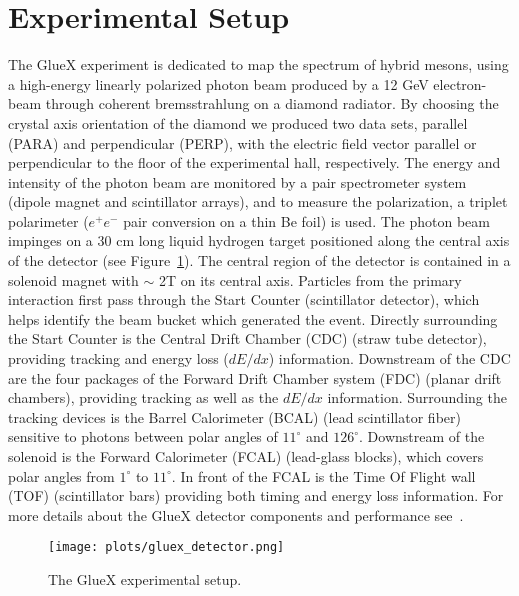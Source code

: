 \documentclass[a4paper]{jpconf}
\begin{document}
\section{Experimental Setup}
The GlueX experiment is dedicated to map the spectrum of hybrid mesons, using a high-energy linearly polarized photon beam produced by a 12 GeV electron-beam through coherent bremsstrahlung on a diamond radiator. By choosing the crystal axis orientation of the diamond we produced two data sets, parallel (PARA) and perpendicular (PERP), with the electric field vector parallel or perpendicular to the floor of the experimental hall, respectively. The energy and intensity of the photon beam are monitored by a pair spectrometer system (dipole magnet and scintillator arrays), and to measure the polarization, a triplet polarimeter ($e^{+}e^{-}$ pair conversion on a thin Be foil) is used. The photon beam impinges on a 30 cm long liquid hydrogen target positioned along the central axis of the detector (see Figure~\ref{fig.1}). The central region of the detector is contained in a solenoid magnet with $\sim$ 2T on its central axis. Particles from the primary interaction first pass through the Start Counter (scintillator detector), which helps identify the beam bucket which generated the event. Directly surrounding the Start Counter is the Central Drift Chamber (CDC) (straw tube detector), providing tracking and energy loss ($dE/dx$) information. Downstream of the CDC are the four packages of the Forward Drift Chamber system (FDC) (planar drift chambers), providing tracking as well as the $dE/dx$ information. Surrounding the tracking devices is the Barrel Calorimeter (BCAL) (lead scintillator fiber) sensitive to photons between polar angles of $11^{\circ}$ and $126^{\circ}$. Downstream of the solenoid is the Forward Calorimeter (FCAL) (lead-glass blocks), which covers polar angles from $1^{\circ}$ to $11^{\circ}$. In front of the FCAL is the Time Of Flight wall (TOF) (scintillator bars) providing both timing and energy loss information. For more details about the GlueX detector components and performance see~\cite{ref.3}.

\begin{figure}[h]
    \centering
    \texttt{[image: plots/gluex\_detector.png]}
    \caption{\label{fig.1}The GlueX experimental setup.}
\end{figure}
\end{document}
